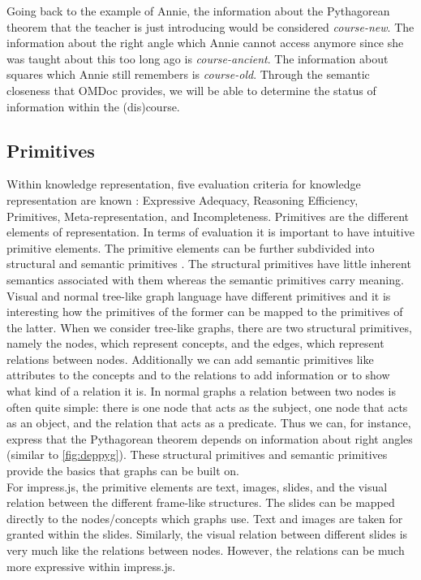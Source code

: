 \documentclass[twoside, 12pt]{article}
\begin{document}
Going back to the example of Annie, the information about the Pythagorean theorem that the teacher is just introducing would be considered \textit{course-new}. The information about the right angle which Annie cannot access anymore since she was taught about this too long ago is \textit{course-ancient}. The information about squares which Annie still remembers is \textit{course-old}. Through the semantic closeness that OMDoc provides, we will be able to determine the status of information within the (dis)course.

\subsection{Primitives}
\label{sec:primitives}

Within knowledge representation, five evaluation criteria for knowledge representation are known \cite{Kohlhase:Complog:base}: Expressive Adequacy, Reasoning Efficiency, Primitives, Meta-representation, and Incompleteness. Primitives are the different elements of representation. In terms of evaluation it is important to have intuitive primitive elements. The primitive elements can be further subdivided into structural and semantic primitives \cite{DBLP:dblp_conf/acl/Salveter80}. The structural primitives have little inherent semantics associated with them whereas the semantic primitives carry meaning.\\

Visual and normal tree-like graph language have different primitives and it is interesting how the primitives of the former can be mapped to the primitives of the latter. When we consider tree-like graphs, there are two structural primitives, namely the nodes, which represent concepts, and the edges, which represent relations between nodes. Additionally we can add semantic primitives like attributes to the concepts and to the relations to add information or to show what kind of a relation it is. In normal graphs a relation between two nodes is often quite simple: there is one node that acts as the subject, one node that acts as an object, and the relation that acts as a predicate. Thus we can, for instance, express that the Pythagorean theorem depends on information about right angles (similar to \autoref{fig:deppyg}). These structural primitives and semantic primitives provide the basics that graphs can be built on.\\

For impress.js, the primitive elements are text, images, slides, and the visual relation between the different frame-like structures. The slides can be mapped directly to the nodes/concepts which graphs use. Text and images are taken for granted within the slides. Similarly, the visual relation between different slides is very much like the relations between nodes. However, the relations can be much more expressive within impress.js.\\
\end{document}
